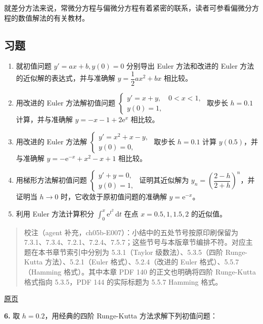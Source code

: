 \documentclass[
  10pt,
  fontset=fandol]{ctexart}
\begin{document}
就差分方法来说，常微分方程与偏微分方程有着紧密的联系，读者可参看偏微分方程的数值解法的有关教材。

\subsection{习题}\label{ux4e60ux9898}

\begin{enumerate}
\def\labelenumi{\arabic{enumi}.}
\item
  就初值问题 \(y'=ax+b,y(0)=0\) 分别导出 Euler 方法和改进的 Euler 方法的近似解的表达式，并与准确解 \(y=\dfrac12ax^2+bx\) 相比较。
\item
  用改进的 Euler 方法解初值问题 \(\begin{cases}y'=x+y,\quad0<x<1,\\y(0)=1,\end{cases}\) 取步长 \(h=0.1\) 计算，并与准确解 \(y=-x-1+2\mathrm e^x\) 相比较。
\item
  用改进的 Euler 方法解 \(\begin{cases}y'=x^2+x-y,\\y(0)=0,\end{cases}\) 取步长 \(h=0.1\) 计算 \(y(0.5)\)，并与准确解 \(y=-\mathrm e^{-x}+x^2-x+1\) 相比较。
\item
  用梯形方法解初值问题 \(\begin{cases}y'+y=0,\\y(0)=1,\end{cases}\) 证明其近似解为 \(y_n=\left(\dfrac{2-h}{2+h}\right)^n\)，并证明当 \(h\to0\) 时，它收敛于原初值问题的准确解 \(y=\mathrm e^{-x}\)。
\item
  利用 Euler 方法计算积分 \(\displaystyle\int_0^x\mathrm e^{t^2}\,\mathrm dt\) 在点 \(x=0.5,1,1.5,2\) 的近似值。
\end{enumerate}

\begin{quote}
校注（agent 补充，ch05b-E007）：小结中的五处节号按原印刷保留为 7.3.1、7.3.4、7.2.1、7.2.4、7.5.7；这些节号与本版章节编排不符。对应主题在本书章节索引中分别为 5.3.1（Taylor 级数法）、5.3.5（四阶 Runge-Kutta 方法）、5.2.1（Euler 格式）、5.2.4（改进的 Euler 格式）、5.5.7（Hamming 格式）。其中本章 PDF 140 的正文也明确将四阶 Runge-Kutta 格式指向 5.3.5，PDF 144 的实际标题为 5.5.7 Hamming 格式。
\end{quote}

\href{../../source-images/pdf-154.jpeg}{原页}

\textbf{6.} 取 \(h=0.2\)，用经典的四阶 Runge-Kutta 方法求解下列初值问题：
\end{document}
